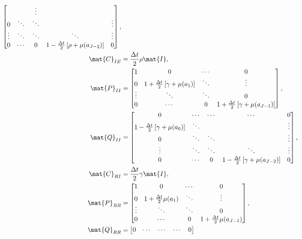 \documentclass{jpmarticle}
\let\subequationsorig\subequations%
\let\endsubequationsorig\endsubequations%
\renewenvironment{subequations}{
  \subequationsorig
  \renewcommand{\theequation}{\theparentequation.\arabic{equation}}
}{
  \endsubequationsorig
}
\begin{document}
\begin{subequations}
\begin{align}
\begin{bmatrix}
      & & \vdots
      \\
      0 & \ddots & \ddots & & \vdots
      \\
      \vdots & \ddots & \ddots & \ddots & \vdots
      \\
      0 & \cdots & 0 &
      1 - \frac{\Delta t}{2} \left[\rho + \mu(a_{J - 2})\right] & 0
    \end{bmatrix},
    \\
    \mat{C}_{IE} &=
    \frac{\Delta t}{2} \rho \mat{I},
    \\
    \mat{P}_{II} &=
    \begin{bmatrix}
      1 & 0 & \cdots & 0
      \\
      0 & 1 + \frac{\Delta t}{2} \left[\gamma + \mu(a_1)\right] &
      \ddots & \vdots
      \\
      \vdots & \ddots & \ddots & 0
      \\
      0 & \cdots & 0 &
      1 + \frac{\Delta t}{2} \left[\gamma + \mu(a_{J - 1})\right]
    \end{bmatrix},
    \\
    \mat{Q}_{II} &=
    \begin{bmatrix}
      0 & \cdots & \cdots & \cdots & 0
      \\
      1 - \frac{\Delta t}{2} \left[\gamma + \mu(a_0)\right] & \ddots &
      & & \vdots
      \\
      0 & \ddots & \ddots & & \vdots
      \\
      \vdots & \ddots & \ddots & \ddots & \vdots
      \\
      0 & \cdots & 0 &
      1 - \frac{\Delta t}{2} \left[\gamma + \mu(a_{J - 2})\right] & 0
    \end{bmatrix},
    \\
    \mat{C}_{RI} &=
    \frac{\Delta t}{2} \gamma \mat{I},
    \\
    \mat{P}_{RR} &=
    \begin{bmatrix}
      1 & 0 & \cdots & 0
      \\
      0 & 1 + \frac{\Delta t}{2} \mu(a_1) &
      \ddots & \vdots
      \\
      \vdots & \ddots & \ddots & 0
      \\
      0 & \cdots & 0 &
      1 + \frac{\Delta t}{2} \mu(a_{J - 1})
    \end{bmatrix},
    \\
    \mat{Q}_{RR} &=
    \begin{bmatrix}
      0 & \cdots & \cdots & \cdots & 0
      \\

\end{bmatrix}
\end{align}
\end{subequations}
\end{document}
